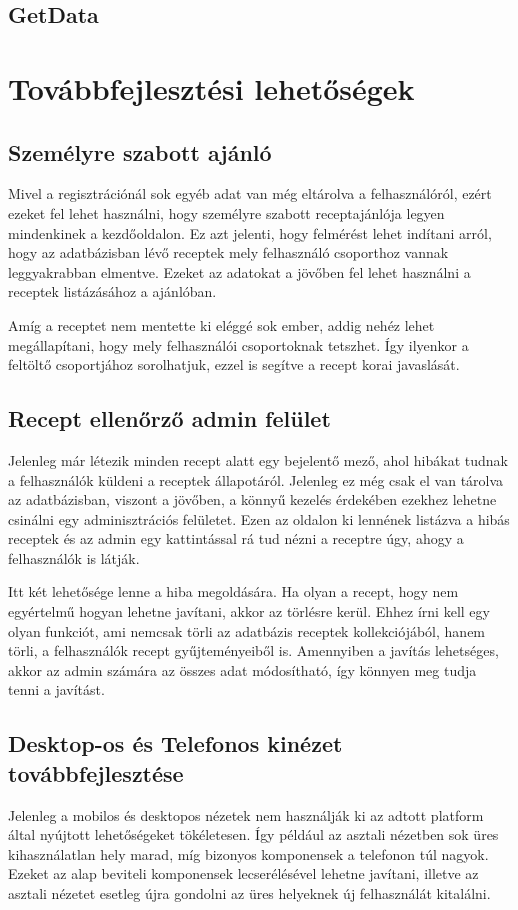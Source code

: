 \documentclass[12pt]{report}
\theoremstyle{definition}
\begin{document}
\section{GetData}

\chapter{Továbbfejlesztési lehetőségek}
\section{Személyre szabott ajánló}
Mivel a regisztrációnál sok egyéb adat van még eltárolva a felhasználóról, ezért ezeket fel lehet használni, hogy személyre szabott receptajánlója legyen mindenkinek a kezdőoldalon. Ez azt jelenti, hogy felmérést lehet indítani arról, hogy az adatbázisban lévő receptek mely felhasználó csoporthoz vannak leggyakrabban elmentve. Ezeket az adatokat a jövőben fel lehet használni a  receptek listázásához a ajánlóban. 

Amíg a receptet nem mentette ki eléggé sok ember, addig nehéz lehet megállapítani, hogy mely felhasználói csoportoknak tetszhet. Így ilyenkor a feltöltő csoportjához sorolhatjuk, ezzel is segítve a recept korai javaslását.


\section{Recept ellenőrző admin felület}
Jelenleg már létezik minden recept alatt egy bejelentő mező, ahol hibákat tudnak a felhasználók küldeni a receptek állapotáról. Jelenleg ez még csak el van tárolva az adatbázisban, viszont a jövőben, a könnyű kezelés érdekében ezekhez lehetne csinálni egy adminisztrációs felületet. Ezen az oldalon ki lennének listázva a hibás receptek és az admin egy kattintással rá tud nézni a receptre úgy, ahogy a felhasználók is látják.

Itt két lehetősége lenne a hiba megoldására. Ha olyan a recept, hogy nem egyértelmű hogyan lehetne javítani, akkor az törlésre kerül. Ehhez írni kell egy olyan funkciót, ami nemcsak törli az adatbázis receptek kollekciójából, hanem törli,  a felhasználók  recept gyűjteményeiből is. Amennyiben a javítás lehetséges, akkor az admin számára az összes adat módosítható, így könnyen meg tudja tenni a javítást.


\section{Desktop-os és Telefonos kinézet továbbfejlesztése}
Jelenleg a mobilos és desktopos nézetek nem használják ki az adtott platform által nyújtott lehetőségeket tökéletesen. Így például az asztali nézetben sok üres kihasználatlan hely marad, míg bizonyos komponensek a telefonon túl nagyok. Ezeket az alap beviteli komponensek lecserélésével lehetne javítani, illetve az asztali nézetet esetleg újra gondolni az üres helyeknek új felhasználát kitalálni.  
\end{document}

